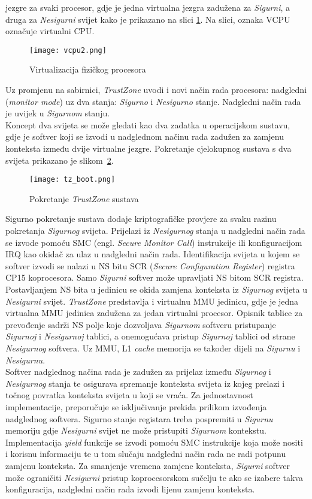 \documentclass[times, utf8, diplomski, numeric]{fer}
\begin{document}
jezgre za svaki procesor, gdje je jedna virtualna jezgra zadužena za \textit{Sigurni}, a druga za \textit{Nesigurni} svijet kako je prikazano na
slici \ref{vcpu}. Na slici, oznaka VCPU označuje virtualni CPU.
\begin{figure}[H]
  \centering
	\texttt{[image: vcpu2.png]}%
	\caption{Virtualizacija fizičkog procesora}
	\label{vcpu}%
\end{figure}
Uz promjenu na
sabirnici, \textit{TrustZone} uvodi i novi način rada procesora: nadgledni (\textit{monitor mode}) uz dva stanja: \textit{Sigurno}
i \textit{Nesigurno} stanje. Nadgledni način rada je uvijek u \textit{Sigurnom} stanju.\\
Koncept dva svijeta se može gledati kao dva zadatka u operacijskom sustavu, gdje je softver koji se izvodi
u nadglednom načinu rada zadužen za zamjenu konteksta između dvije virtualne jezgre. Pokretanje cjelokupnog sustava s dva
svijeta prikazano je slikom~\ref{tz_boot}.
\begin{figure}[H]
  \centering
	\texttt{[image: tz\_boot.png]}%
	\caption{Pokretanje \textit{TrustZone} sustava}
	\label{tz_boot}%
\end{figure}
Sigurno pokretanje sustava dodaje kriptografičke provjere za svaku razinu pokretanja \textit{Sigurnog} svijeta.
Prijelazi iz \textit{Nesigurnog} stanja u nadgledni
način rada se izvode pomoću SMC (engl. \textit{Secure Monitor Call}) instrukcije ili konfiguracijom IRQ kao okidač za ulaz
u nadgledni način rada. Identifikacija svijeta u kojem se softver izvodi se nalazi u NS bitu SCR (\textit{Secure
Configuration Register}) registra CP15 koprocesora. Samo \textit{Sigurni} softver može upravljati NS bitom SCR registra. Postavljanjem
NS bita u jedinicu se okida zamjena konteksta iz \textit{Sigurnog} svijeta u \textit{Nesigurni} svijet. \textit{TrustZone} predstavlja i
virtualnu MMU jedinicu, gdje je jedna virtualna MMU jedinica zadužena za jedan virtualni procesor. Opisnik tablice za prevođenje
sadrži NS polje koje dozvoljava \textit{Sigurnom} softveru pristupanje \textit{Sigurnoj} i \textit{Nesigurnoj} tablici, a onemogućava pristup \textit{Sigurnoj}
tablici od strane \textit{Nesigurnog} softvera. Uz MMU, L1 \textit{cache} memorija se također dijeli na \textit{Sigurnu} i \textit{Nesigurnu}.\\
Softver nadglednog načina rada je zadužen za prijelaz između \textit{Sigurnog} i \textit{Nesigurnog} stanja te osigurava spremanje konteksta
svijeta iz kojeg prelazi i točnog povratka konteksta svijeta u koji se vraća. Za jednostavnost implementacije, preporučuje
se isključivanje prekida prilikom izvođenja nadglednog softvera. Sigurno stanje registara treba pospremiti u \textit{Sigurnu} memoriju
gdje \textit{Nesigurni} svijet ne može pristupiti \textit{Sigurnom} kontekstu. Implementacija \textit{yield} funkcije se izvodi pomoću SMC
instrukcije koja može nositi i korisnu informaciju te u tom slučaju nadgledni način rada ne radi potpunu zamjenu konteksta.
Za smanjenje vremena zamjene konteksta, \textit{Sigurni} softver može ograničiti \textit{Nesigurni} pristup koprocesorskom sučelju te ako se
izabere takva konfiguracija, nadgledni način rada izvodi lijenu zamjenu konteksta.
\end{document}
